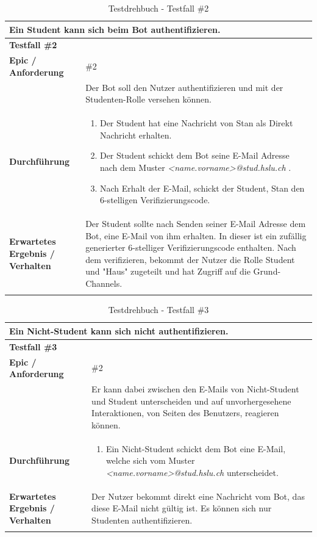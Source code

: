 \documentclass[a4paper, table]{article}
\begin{document}
\begin{longtable}[h]{|p{15em}|p{25em}|}
    \hline
    \multicolumn{2}{|l|}{\textbf{Ein Student kann sich beim Bot authentifizieren.}} \\
    \hline
    \multicolumn{2}{|l|}{\textbf{Testfall \#2}} \\
    \hline
    \textbf{Epic / Anforderung} & \#2 \\*
     & Der Bot soll den Nutzer authentifizieren und mit der Studenten-Rolle versehen können. \\
    \hline
    \textbf{Durchführung} &
    \begin{enumerate}
        \item Der Student hat eine Nachricht von Stan als Direkt Nachricht erhalten.
        \item Der Student schickt dem Bot seine E-Mail Adresse nach dem Muster \textit{<name.vorname>@stud.hslu.ch} .
        \item Nach Erhalt der E-Mail, schickt der Student, Stan den 6-stelligen Verifizierungscode.
    \end{enumerate}\\
    \hline
    \textbf{Erwartetes Ergebnis / Verhalten} & Der Student sollte nach Senden seiner E-Mail Adresse dem Bot, eine E-Mail von ihm erhalten.
    In dieser ist ein zufällig generierter 6-stelliger Verifizierungscode enthalten.
    Nach dem verifizieren, bekommt der Nutzer die Rolle Student und "Haus" zugeteilt und hat Zugriff auf die Grund-Channels. \\
    \hline
    \caption{Testdrehbuch - Testfall \#2}
\end{longtable}

\begin{longtable}[h]{|p{15em}|p{25em}|}
    \hline
    \multicolumn{2}{|l|}{\textbf{Ein Nicht-Student kann sich nicht authentifizieren.}} \\
    \hline
    \multicolumn{2}{|l|}{\textbf{Testfall \#3}} \\
    \hline
    \textbf{Epic / Anforderung} & \#2 \\*
     & Er kann dabei zwischen den E-Mails von Nicht-Student und Student unterscheiden und
     auf unvorhergesehene Interaktionen, von Seiten des Benutzers, reagieren können. \\
    \hline
    \textbf{Durchführung} &
    \begin{enumerate}
        \item Ein Nicht-Student schickt dem Bot eine E-Mail, welche sich vom Muster \textit{<name.vorname>@stud.hslu.ch} unterscheidet.
    \end{enumerate}\\
    \hline
    \textbf{Erwartetes Ergebnis / Verhalten} & Der Nutzer bekommt direkt eine Nachricht vom Bot, das diese E-Mail nicht gültig ist.
    Es können sich nur Studenten authentifizieren. \\
    \hline
    \caption{Testdrehbuch - Testfall \#3}
\end{longtable}
\end{document}
